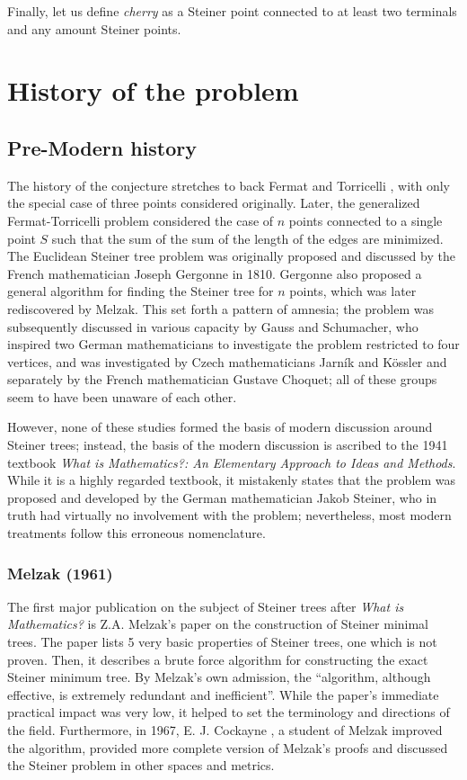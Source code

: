 \documentclass{mpaper}
\begin{document}
Finally, let us define \emph{cherry} as a Steiner point connected to at least two terminals and any amount Steiner points.


\section{History of the problem}
\subsection{Pre-Modern history}

The history of the conjecture stretches to back Fermat and Torricelli \cite{Brazil2014}, with only the special case of three points considered originally. Later, the generalized Fermat-Torricelli problem considered the case of $n$ points connected to a single point $S$ such that the sum of the sum of the length of the edges are minimized. The Euclidean Steiner tree problem was originally proposed and discussed by  the French mathematician Joseph Gergonne in 1810. Gergonne also proposed a general algorithm for finding the Steiner tree for $n$ points, which was later rediscovered by Melzak. This set forth a pattern of amnesia; the problem was subsequently discussed in various capacity by Gauss and Schumacher, who inspired two German mathematicians to investigate the problem restricted to four vertices, and was investigated by Czech mathematicians Jarník and Kössler and separately by the French mathematician Gustave Choquet; all of these groups seem to have been unaware of each other.

However, none of these studies formed the basis of modern discussion around Steiner trees; instead, the basis of the modern discussion is ascribed to the 1941 textbook \emph{What is Mathematics?: An Elementary Approach to Ideas and Methods}\cite{courant1996mathematics}. While it is a highly regarded textbook, it mistakenly states that the problem was proposed and developed by the German mathematician Jakob Steiner, who in truth had virtually no involvement with the problem; nevertheless, most modern treatments follow this erroneous nomenclature.

\subsubsection{Melzak (1961) \cite{melzak_1961}}
The first major publication on the subject of Steiner trees after \emph{What is Mathematics?} is Z.A. Melzak's paper on the construction of Steiner minimal trees. The paper lists 5 very basic properties of Steiner trees, one which is not proven. Then, it describes a brute force algorithm for constructing the exact Steiner minimum tree. By Melzak's own admission, the ``algorithm, although effective, is extremely redundant and inefficient''. While the paper's immediate practical impact was very low, it helped to set the terminology and directions of the field. Furthermore, in 1967,  E. J. Cockayne \cite{cockayne_1967}, a student of Melzak improved the algorithm, provided more complete version of Melzak's proofs and discussed the Steiner problem in other spaces and metrics.
\end{document}
